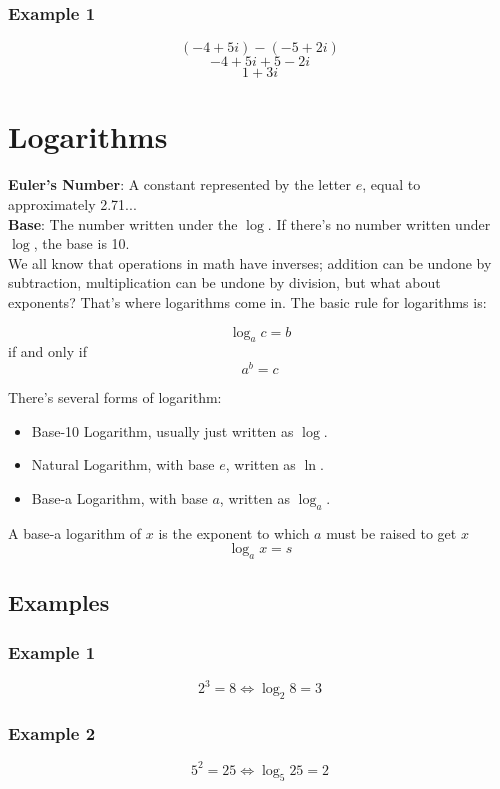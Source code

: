 \documentclass{article}
\begin{document}
\subsubsection{Example 1}
$$(-4 + 5i) - (-5 + 2i)$$
$$-4 + 5i + 5 - 2i$$
$$1 + 3i$$

\section{Logarithms}
\textbf{Euler's Number}: A constant represented by the letter $e$, equal to approximately 2.71... \\
\textbf{Base}: The number written under the $\log$. If there's no number written under $\log$, the base is 10. \\

\noindent We all know that operations in math have inverses; addition can be undone by subtraction, multiplication can be undone by division, but what about exponents? That's where logarithms come in. The basic rule for logarithms is: 

\begin{center}
	$$\log_a c = b$$ 
	if and only if 
	$$a^b = c$$
\end{center}

There's several forms of logarithm: 
\begin{itemize}
	\item Base-10 Logarithm, usually just written as $\log$.
	\item Natural Logarithm, with base $e$, written as $\ln$.
	\item Base-a Logarithm, with base $a$, written as $\log_a$.
\end{itemize}

A base-a logarithm of $x$ is the exponent to which $a$ must be raised to get $x$
$$\log_a x = s$$

\subsection{Examples}
\subsubsection{Example 1}
$$2^3 = 8 \Leftrightarrow \log_2 8 = 3$$

\subsubsection{Example 2}
$$5^2 = 25 \Leftrightarrow \log_5 25 = 2$$
\end{document}
